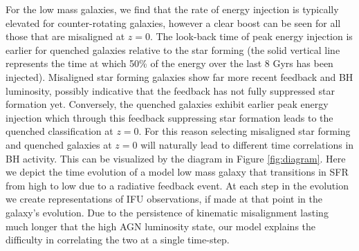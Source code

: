 For the low mass galaxies, we find that the rate of energy injection is typically elevated for counter-rotating galaxies, however a clear boost can be seen for all those that are misaligned at $z=0$. The look-back time of peak energy injection is earlier for quenched galaxies relative to the star forming (the solid vertical line represents the time at which 50\% of the energy over the last 8 Gyrs has been injected). Misaligned star forming galaxies show far more recent feedback and BH luminosity, possibly indicative that the feedback has not fully suppressed star formation yet. Conversely, the quenched galaxies exhibit earlier peak energy injection which through this feedback suppressing star formation leads to the quenched classification at $z=0$. For this reason selecting misaligned star forming and quenched galaxies at $z=0$ will naturally lead to different time correlations in BH activity. This can be visualized by the diagram in Figure \ref{fig:diagram}. Here we depict the time evolution of a model low mass galaxy that transitions in SFR from high to low due to a radiative feedback event. At each step in the evolution we create representations of IFU observations, if made at that point in the galaxy's evolution. Due to the persistence of kinematic misalignment lasting much longer that the high AGN luminosity state, our model explains the difficulty in correlating the two at a single time-step. 

